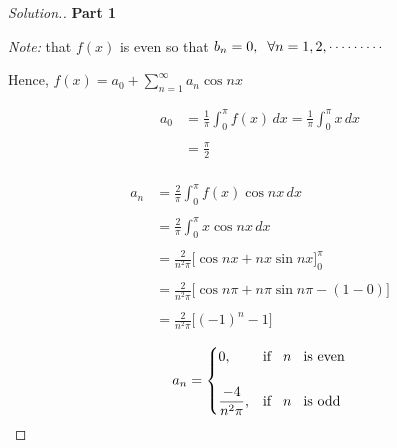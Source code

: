 \documentclass[11pt,a4paper]{article}
\theoremstyle{definition}
\newenvironment{solution}
  {\renewcommand{\qedsymbol}{}\begin{proof}[\textit{Solution}.]}
  {\end{proof}}
\newcommand{\subhead}[1]{%
  \par\medskip\noindent\textbf{#1}\par\nobreak\smallskip}
\begin{document}
\begin{solution}
\subhead{Part 1}

\begin{figure}[H]
\centering
{}
\end{figure}

\textit{Note:} that $f(x)$ is even so that $b_n = 0,\hspace{0.2cm} \forall n = 1,2,\cdots\cdots\cdots$

Hence, $\displaystyle{f(x) = a_0  + \sum^{\infty}_{n=1}a_n \cos n x}$

\begin{align*}
a_0 &= \frac{1}{\pi} \int^{\pi}_0 f(x)\,dx
  = \frac{1}{\pi}\int^{\pi}_0 x\,dx\\\\
& = \frac{\pi}{2}\\
\end{align*} 

\begin{align*}
a_n & = \frac{2}{\pi}\int^{\pi}_0 f(x) \cos nx \,dx\\\\
& = \frac{2}{\pi}\int^{\pi}_0 x \cos n x\,dx\\\\
& = \frac{2}{n^2\pi}\Big[\cos nx + nx\sin nx \Big]^{\pi}_0\\\\
& = \frac{2}{n^2\pi}\Big[\cos n\pi + n\pi \sin n\pi - (1-0)\Big]\\\\
& =\frac{2}{n^2\pi}\big[(-1)^n-1\big]
\end{align*}

\[a_n = 
\begin{cases}
0, & \text{if}\hspace{0.3cm} n \hspace{0.3cm}\text{is even}\\\\
\dfrac{-4}{n^2\pi}, & \text{if}\hspace{0.3cm} n \hspace{0.3cm} \text{is odd}\\
\end{cases}
\]


\end{solution}
\end{document}
